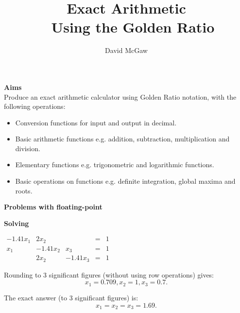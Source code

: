 \documentclass{csslides}\raggedright
\begin{document}
\title{Exact Arithmetic \\~ Using the Golden Ratio \\ [5ex]}
\author{David McGaw}
\date[CS]{}
\maketitle

\begin{slide}{}
  \vfill
  {\bf Aims} \\
  Produce an exact arithmetic calculator using Golden Ratio notation,
  with the following operations:
\begin{itemize}
\item Conversion functions for input and output in decimal.
\item Basic arithmetic functions e.g.  addition, subtraction, multiplication and division.
\item Elementary functions e.g.  trigonometric and logarithmic functions.
\item Basic operations on functions e.g.  definite integration, global maxima and roots.
\end{itemize}
\vfill
\end{slide}

\begin{slide}{}
{\bf Problems with floating-point}

\vfill

{\bf Solving}

\begin{center}
\begin{math}
\begin{array}{ccccc}
-1.41x_{1} & 2x_{2} & & = & 1 \\
x_{1} & -1.41x_{2} & x_{3} & = & 1 \\
 & 2x_{2} & -1.41x_{3}  & = & 1
\end{array}
\end{math}
\end{center}

\vfill

Rounding to 3 significant figures (without using row operations) gives:
\[ x_{1}=0.709, x_{2}=1, x_{3}=0.7.\]

The exact answer (to 3 significant figures) is: 
\[ x_{1}=x_{2}=x_{3}=1.69. \]

\vfill
\end{slide}
\end{document}
